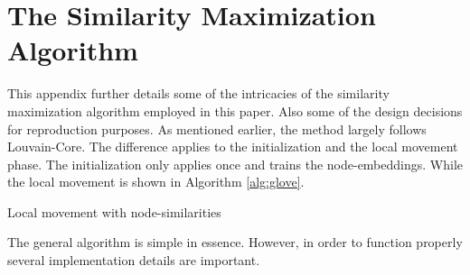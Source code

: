 \documentclass[11pt, twocolumn]{article}
\begin{document}
\section{The Similarity Maximization Algorithm}
This appendix further details some of the intricacies of the similarity maximization algorithm employed in this paper. Also some of the design decisions for reproduction purposes. As mentioned earlier, the method largely follows Louvain-Core. The difference applies to the initialization and the local movement phase. The initialization only applies once and trains the node-embeddings. While the local movement is shown in Algorithm \autoref{alg:glove}.
\begin{algorithm*}[htb]
\label{alg:glove}
\SetAlgoLined
{}


\caption{Local movement with node-similarities}
\end{algorithm*}
The general algorithm is simple in essence. However, in order to function properly several implementation details are important. 
\end{document}
